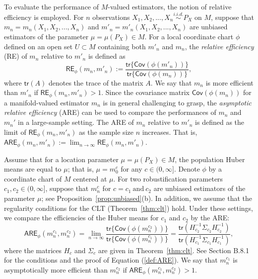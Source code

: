 \documentclass[preprint]{imsart}
\theoremstyle{plain}
\theoremstyle{remark}
\begin{document}
To evaluate the performance of $M$-valued estimators, the notion of relative efficiency is employed. For $n$ observations $X_{1}, X_{2}, ..., X_{n} \overset{i.i.d.}{\sim} P_{X}$ on $M$, suppose that $m_n = m_{n}(X_{1}, X_{2}, ..., X_{n})$ and $m'_n = m'_{n}(X_{1}, X_{2}, ..., X_{n})$ are unbiased estimators of the parameter $\mu = \mu(P_X) \in M$. For a local coordinate chart $\phi$ defined on an open set $U \subset M$ containing both $m'_{n}$ and $m_{n}$, the \textit{relative efficiency} (RE) of $m_{n}$ relative to $m'_{n}$ is defined as 
\begin{equation}\label{def:RE}
\textsf{RE}_{\phi}(m_{n}, m'_{n}) := \frac{ \textsf{tr}\{\textsf{Cov}(\phi(m'_{n}))\}}{\textsf{tr}\{\textsf{Cov}(\phi(m_{n}))\}}, 
\end{equation} 
where $\textsf{tr}(A)$ denotes the trace of the matrix $A$. We say that $m_{n}$ is more efficient than $m'_{n}$ if $\textsf{RE}_{\phi}(m_{n}, m'_{n}) > 1$. Since the covariance matrix $\textsf{Cov}(\phi(m_{n}))$ for a manifold-valued estimator $m_n$ is in general challenging to grasp, the \textit{asymptotic relative efficiency} (ARE) can be used to compare the performances of $m_n$ and $m_n'$ in a large-sample setting. The ARE of $m_n$  relative to $m'_n$ is defined as the limit of $\textsf{RE}_{\phi}(m_{n}, m'_{n}) $ as the sample size $n$ increases. That is, 
$\textsf{ARE}_{\phi}(m_{n}, m'_{n}):= \lim_{n \rightarrow \infty} \textsf{RE}_{\phi}(m_{n}, m'_{n})$.

Assume that for a location parameter $\mu = \mu(P_{X}) \in M$, the population Huber means are equal to $\mu$; that is, $\mu=m_{0}^c$  for any $c \in (0, \infty]$. Denote $\phi$ by a coordinate chart of $M$ centered at $\mu$. For two robustification parameters $c_1, c_2 \in (0, \infty]$, suppose that $m^{c}_{n}$ for $c=c_{1} ~ \mbox{and} ~ c_{2}$ are unbiased estimators of the parameter $\mu$; see Proposition~\ref{prop:unbiased}(b). In addition, we assume that the regularity  conditions for the CLT (Theorem~\ref{thm:clt}) hold. Under these settings, we compare the efficiencies of the Huber means for $c_1$ and $c_2$ by the ARE:
\begin{equation}\label{def:ARE}
\textsf{ARE}_{\phi}(m^{c_{1}}_{n}, m^{c_{2}}_{n}) = \lim_{n \rightarrow \infty} \frac{\textsf{tr}\{\textsf{Cov}(\phi(m^{c_{2}}_{n}))\}}{\textsf{tr}\{\textsf{Cov}(\phi(m^{c_{1}}_{n}))\}} = \frac{\textsf{tr}(H_{c_{2}}^{-1}\Sigma_{c_{2}} H_{c_{2}}^{-1})}{\textsf{tr}(H_{c_{1}}^{-1}\Sigma_{c_{1}} H_{c_{1}}^{-1})},
\end{equation}
where the matrices $H_c$ and $\Sigma_c$ are given in Theorem~\ref{thm:clt}. 
See Section B.8.1 for the conditions and the proof of Equation (\ref{def:ARE}). 
We say that $m^{c_{1}}_{n}$ is asymptotically more efficient than $m^{c_{2}}_{n}$ if $\textsf{ARE}_{\phi}(m^{c_{1}}_{n}, m^{c_2}_{n}) > 1$. 
\end{document}

